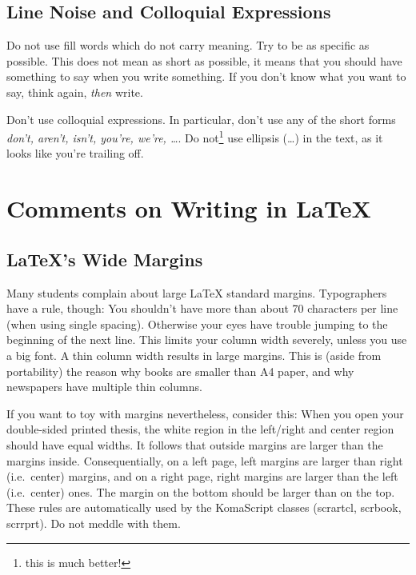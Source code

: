 \documentclass[{{cookiecutter.project_slug}}.tex]{subfiles}
\begin{document}
    \section{Line Noise and Colloquial Expressions}

    Do  not use  fill words  which do  not carry  meaning.  Try  to be  as 
    specific as  possible.  This does  not mean  as short as  possible, it 
    means that you should have something to say when you write something.
    If you don't know what you want to say, think again, \emph{then} write.

    Don't use colloquial expressions.  In particular, don't use any of the 
    short forms  \emph{don't, aren't,  isn't, you're, we're,  \ldots}.  Do 
    not\footnote{this is much better!} use  ellipsis (\ldots) in the text, 
    as it looks like you're trailing off.                                  

    \chapter{Comments on Writing in LaTeX}

    \section{\LaTeX{}'s Wide Margins}

    Many students  complain  about  large  \LaTeX{}  standard  margins. 
    Typographers have a  rule, though: You shouldn't have  more than about 
    70 characters  per line (when  using single spacing).   Otherwise your 
    eyes have  trouble jumping to  the beginning  of the next  line.  This 
    limits  your column  width severely,  unless you  use a  big font.   A 
    thin  column width  results in  large  margins.  This  is (aside  from 
    portability) the reason  why books are smaller than A4  paper, and why 
    newspapers have multiple thin columns.                                 

    If  you want  to toy  with margins  nevertheless, consider  this: When 
    you  open  your  double-sided  printed thesis,  the  white  region  in 
    the  left/right  and  center  region should  have  equal  widths.   It 
    follows  that outside  margins  are larger  than  the margins  inside. 
    Consequentially, on  a left page,  left margins are larger  than right 
    (i.e.\ center) margins, and on a  right page, right margins are larger 
    than the left (i.e.\ center) ones. The  margin on the bottom should be 
    larger than  on the top.   These rules  are automatically used  by the 
    KomaScript classes  (scrartcl, scrbook, scrrprt).  Do  not meddle with 
    them.                                                                  
    
\end{document}
